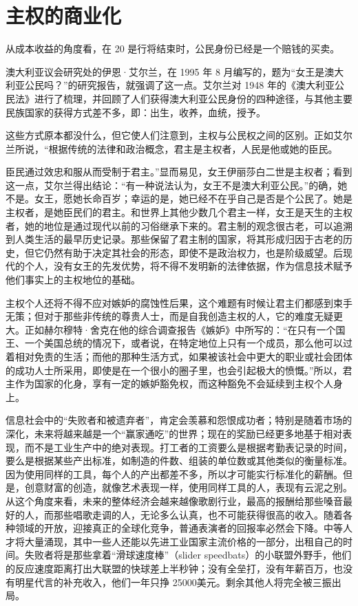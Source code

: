 \section{主权的商业化}
从成本收益的角度看，在 20 是行将结束时，公民身份已经是一个赔钱的买卖。

澳大利亚议会研究处的伊恩·艾尔兰，在 1995 年 8 月编写的，题为“女王是澳大利亚公民吗？”的研究报告，就强调了这一点。艾尔兰对 1948 年的《澳大利亚公民法》进行了梳理，并回顾了人们获得澳大利亚公民身份的四种途径，与其他主要民族国家的获得方式差不多，即：出生，收养，血统，授予。

这些方式原本都没什么，但它使人们注意到，主权与公民权之间的区别。正如艾尔兰所说，“根据传统的法律和政治概念，君主是主权者，人民是他或她的臣民。

臣民通过效忠和服从而受制于君主。”显而易见，女王伊丽莎白二世是主权者；看到这一点，艾尔兰得出结论：“有一种说法认为，女王不是澳大利亚公民。”的确，她不是。女王，愿她长命百岁；幸运的是，她已经不在乎自己是否是个公民了。她是主权者，是她臣民们的君主。和世界上其他少数几个君主一样，女王是天生的主权者，她的地位是通过现代以前的习俗继承下来的。君主制的观念很古老，可以追溯到人类生活的最早历史记录。那些保留了君主制的国家，将其形成归因于古老的历史，但它仍然有助于决定其社会的形态，即使不是政治权力，也是阶级威望。后现代的个人，没有女王的先发优势，将不得不发明新的法律依据，作为信息技术赋予他们事实上的主权地位的基础。

主权个人还将不得不应对嫉妒的腐蚀性后果，这个难题有时候让君主们都感到束手无策；但对于那些非传统的尊贵人士，而是自我创造主权的人，它的难度无疑更大。正如赫尔穆特·舍克在他的综合调查报告《嫉妒》中所写的：“在只有一个国王、一个美国总统的情况下，或者说，在特定地位上只有一个成员，那么他可以过着相对免责的生活；而他的那种生活方式，如果被该社会中更大的职业或社会团体的成功人士所采用，即使是在一个很小的圈子里，也会引起极大的愤慨。”所以，君主作为国家的化身，享有一定的嫉妒豁免权，而这种豁免不会延续到主权个人身上。

信息社会中的“失败者和被遗弃者”，肯定会羡慕和怨恨成功者；特别是随着市场的深化，未来将越来越是一个“赢家通吃”的世界；现在的奖励已经更多地基于相对表现，而不是工业生产中的绝对表现。打工者的工资要么是根据考勤表记录的时间，要么是根据某些产出标准，如制造的件数、组装的单位数或其他类似的衡量标准。因为使用同样的工具，每个人的产出都差不多，所以才可能实行标准化的薪酬。但是，创意财富的创造，就像艺术表现一样，使用同样工具的人，表现有云泥之别。从这个角度来看，未来的整体经济会越来越像歌剧行业，最高的报酬给那些嗓音最好的人，而那些唱歌走调的人，无论多么认真，也不可能获得很高的收入。随着各种领域的开放，迎接真正的全球化竞争，普通表演者的回报率必然会下降。中等人才将大量涌现，其中一些人还能以先进工业国家主流价格的一部分，出租自己的时间。失败者将是那些拿着“滑球速度棒”（slider speedbats）的小联盟外野手，他们的反应速度距离打出大联盟的快球差上半秒钟；没有全垒打，没有年薪百万，也没有明星代言的补充收入，他们一年只挣 25000美元。剩余其他人将完全被三振出局。

